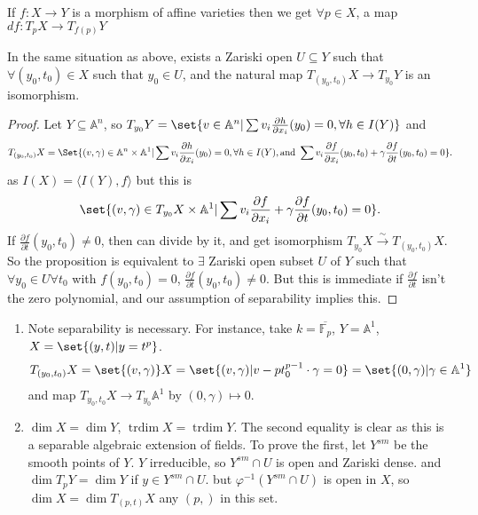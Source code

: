 \documentclass{article}
\newcommand{\A}{\mathbb{A}}
\DeclareMathOperator{\trdim}{trdim}
\begin{document}
\begin{ex}
    If $f: X \to Y$ is a morphism of affine varieties then we get $\forall p \in X$, a map $df: T_p X \to T_{f(p)} Y$
\end{ex}
\begin{prop}
    In the same situation as above, exists a Zariski open $U \subseteq Y$ such that $\forall (y_0, t_0) \in X$ such that $y_0 \in U$, and the natural map $T_{(y_0, t_0)} X \to T_{y_0} Y$ is an isomorphism.
\end{prop}
\begin{proof}
    Let $Y \subseteq \A^n$, so $T_{y_0} Y = \set{v \in \A^n | \sum v_i \frac{\partial h}{\partial x_i}(y_0) = 0, \forall h \in I(Y)}$ and
    \begin{equation*}
        T_{(y_0, t_0)} X = \Set{(v, \gamma) \in \A^n \times \A^1 | \sum v_i \frac{\partial h}{\partial x_i}(y_0) = 0, \forall h \in I(Y), \text{and } \sum v_i \frac{\partial f}{\partial x_i} (y_0, t_0) + \gamma \frac{\partial f}{\partial t}(y_0, t_0) = 0}.
    \end{equation*}
    as $I(X) = \langle I(Y), f \rangle$ but this is
    \begin{equation*}
        \set{(v, \gamma) \in T_{y_0} X \times \A^1 | \sum v_i \frac{\partial f}{\partial x_i} + \gamma \frac{\partial f}{\partial t}(y_0, t_0) = 0}.
    \end{equation*}
    If $\frac{\partial f}{\partial t}(y_0, t_0) \neq 0$, then can divide by it, and get isomorphism $T_{y_0} X \overset{\sim}{\rightarrow} T_{(y_0, t_0)} X$.
    So the proposition is equivalent to $\exists$ Zariski open subset $U$ of $Y$ such that $\forall y_0 \in U \forall t_0$ with $f(y_0, t_0) = 0$, $\frac{\partial f}{\partial t}(y_0, t_0) \neq 0$.
    But this is immediate if $\frac{\partial f}{\partial t}$ isn't the zero polynomial, and our assumption of separability implies this.
\end{proof}

\begin{enumerate}[label=(\arabic*)]
    \item Note separability is necessary. For instance, take $k = \overline{\mathbb{F}_p}$, $Y = \A^1$, $X = \set{(y, t) | y = t^p}$.
        \begin{equation*}
            T_{(y_0, t_0)} X = \set{(v, \gamma)} X = \set{(v, \gamma) | v - p t_0^{p-1} \cdot \gamma = 0} = \set{(0, \gamma) | \gamma \in \A^1}
        \end{equation*}
        and map $T_{y_0, t_0} X \to T_{y_0} \A^1$ by $(0, \gamma) \mapsto 0$.
    \item $\dim X = \dim Y$, $\trdim X = \trdim Y$. The second equality is clear as this is a separable algebraic extension of fields.
        To prove the first, let $Y^{sm}$ be the smooth points of $Y$. $Y$ irreducible, so $Y^{sm} \cap U$ is open and Zariski dense. and $\dim T_p Y = \dim Y$ if $y \in Y^{sm} \cap U$.
        but $\varphi^{-1} (Y^{sm} \cap U)$ is open in $X$, so $\dim X = \dim T_{(p, t)} X$ any $(p, )$ in this set.
\end{enumerate}
\end{document}
